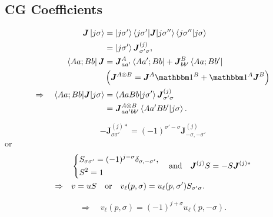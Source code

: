 \subsection{CG Coefficients}
\begin{align}
    \boldsymbol{J} \ket{j \sigma} & = \ket{j \sigma'} \braket{j \sigma' | \boldsymbol{J} | j \sigma''} \braket{j \sigma'' | j \sigma} \notag \\
    & = \ket{j \sigma'} \boldsymbol{J}^{(j)}_{\sigma' \sigma}, \notag \\
    \bra{A a; B b} \boldsymbol{J} & = \boldsymbol{J}^A_{a a'} \bra{A a'; B b} + \boldsymbol{J}^B_{b b'} \bra{A a; B b'} \\
    & \left( \boldsymbol{J}^{A \otimes B} = \boldsymbol{J}^A \id^B + \id^A \boldsymbol{J}^B \right) \\
    \Rightarrow \quad \braket{A a; B b | \boldsymbol{J} | j \sigma} & = \braket{A a B b | j \sigma'} \boldsymbol{J}^{(j)}_{\sigma' \sigma} \notag \\
    & = \boldsymbol{J}^{A \otimes B}_{a a' b b'} \braket{A a' B b' | j \sigma}.
\end{align}
\begin{framed}
    \begin{equation}
        - \boldsymbol{J}^{(j)*}_{\sigma \sigma'} = (- 1)^{\sigma' - \sigma} \boldsymbol{J}^{(j)}_{- \sigma, - \sigma'}
    \end{equation}
    or
    \begin{align}
        & \begin{dcases}
            S_{\sigma \sigma'} = (- 1)^{j - \sigma} \delta_{\sigma, - \sigma'}, \\
            S^2 = 1
        \end{dcases}
        \quad \text{and} \quad \boldsymbol{J}^{(j)} S = - S \boldsymbol{J}^{(j)*} \\
        \Rightarrow \quad & v = u S \quad \text{or} \quad v_\ell(p, \sigma) = u_\ell(p, \sigma') S_{\sigma' \sigma}.
    \end{align}
\end{framed}
\begin{equation}
    \Rightarrow \quad v_\ell(p, \sigma) = (- 1)^{j + \sigma} u_\ell(p, - \sigma).
\end{equation}
